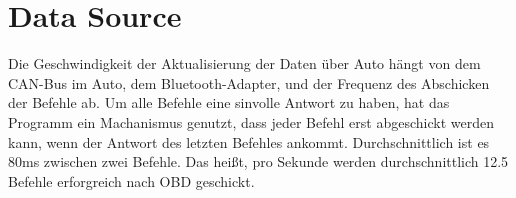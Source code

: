 \documentclass[qualitaetssicherung.tex]{subfiles}
\begin{document}
\section{Data Source}
Die Geschwindigkeit der Aktualisierung der Daten über Auto hängt von dem CAN-Bus
im Auto, dem Bluetooth-Adapter, und der Frequenz des Abschicken der Befehle ab.
Um alle Befehle eine sinvolle Antwort zu haben, hat das Programm ein
Machanismus genutzt, dass jeder Befehl erst abgeschickt werden kann, wenn der
Antwort des letzten Befehles ankommt. Durchschnittlich ist es 80ms zwischen zwei
Befehle. Das heißt, pro Sekunde werden durchschnittlich 12.5 Befehle erforgreich
nach OBD geschickt.
\end{document}

